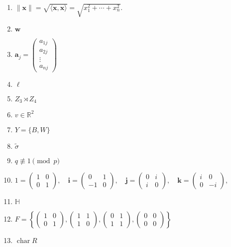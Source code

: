 \documentclass[oneside,10pt,]{article}
\newcommand{\chr}{\operatorname{char}}
\begin{document}
\begin{enumerate}
\item{}\(\| {\mathbf x} \| = \sqrt{\langle  {\mathbf x}, {\mathbf x} \rangle}  = \sqrt{x_1^2 + \cdots + x_n^2}\text{.}\)%
\item{}\({\mathbf w}\)%
\item{}\({\mathbf a}_j =
\begin{pmatrix}
a_{1j} \\ a_{2j} \\ \vdots \\ a_{nj}
\end{pmatrix}\)%
\item{}\(\ell\)%
\item{}\(Z_3\rtimes Z_4\)%
\item{}\(v \in {\mathbb R}^2\)%
\item{}\(Y = \{ B, W \}\)%
\item{}\(\widetilde{ \sigma }\)%
\item{}\(q \not\equiv 1 \pmod{p}\)%
\item{}\(1 = 
\begin{pmatrix}
1 & 0 \\
0 & 1
\end{pmatrix},
\quad
{\mathbf i}
=
\begin{pmatrix}
0 & 1 \\
-1 & 0
\end{pmatrix},
\quad
{\mathbf j} =
\begin{pmatrix}
0 & i \\
i & 0
\end{pmatrix},
\quad
{\mathbf k} = 
\begin{pmatrix}
i & 0 \\
0 & -i
\end{pmatrix}\text{,}\)%
\item{}\({\mathbb H}\)%
\item{}\(F =
\left\{
\begin{pmatrix}
1 & 0 \\
0 & 1
\end{pmatrix},
\begin{pmatrix}
1 & 1 \\
1 & 0
\end{pmatrix},
\begin{pmatrix}
0 & 1 \\
1 & 1
\end{pmatrix},
\begin{pmatrix}
0 & 0 \\
0 & 0
\end{pmatrix}
\right\}\)%
\item{}\(\chr R\)%

\end{enumerate}
\end{document}
